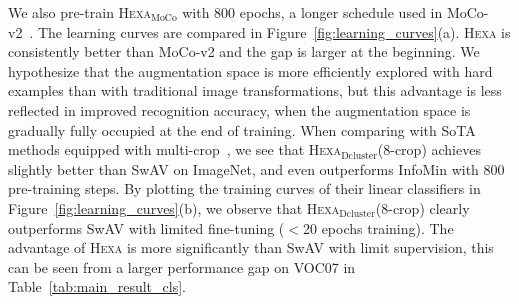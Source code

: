 \documentclass[10pt,twocolumn,letterpaper]{article}
\newcommand{\shortname}{\textsc{Hexa}}
\begin{document}
We also pre-train \shortname{}$_{\text{MoCo}}$ with 800 epochs, a longer schedule used in MoCo-v2~\cite{chen2020improved}. The learning curves are compared in Figure~\ref{fig:learning_curves}(a). 
\shortname{} is consistently better than MoCo-v2 and the gap is larger at the beginning. We hypothesize that the augmentation space is more efficiently explored with hard examples than with traditional image transformations, but this advantage is less reflected in improved recognition accuracy, when the augmentation space is gradually fully occupied at the end of training.
When comparing with SoTA methods equipped with multi-crop~\cite{caron2020unsupervised}, we see that \shortname{}$_{\text{Dcluster}}$(8-crop) achieves slightly better than SwAV on ImageNet, and even outperforms InfoMin with 800 pre-training steps. By plotting the training curves of their linear classifiers in Figure~\ref{fig:learning_curves}(b), we observe that \shortname{}$_{\text{Dcluster}}$(8-crop) clearly outperforms SwAV with limited fine-tuning (\eg $<$20 epochs training). The advantage of \shortname{} is more significantly than SwAV with limit supervision, this can be seen from a larger performance gap on VOC07 in Table~\ref{tab:main_result_cls}. 
\end{document}
